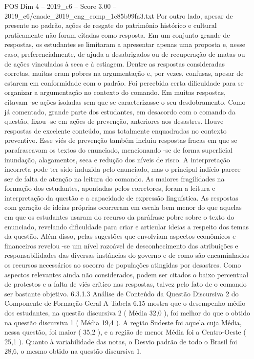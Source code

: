 \begin{textsample}{POS Dim 4 – 2019\_c6 – Score 3.00 – 2019\_c6/enade\_2019\_eng\_comp\_1c85b99fa3.txt}
Por outro lado, apesar de presente no padrão, ações de resgate do patrimônio histórico e cultural praticamente não foram citadas como resposta.
Em um conjunto grande de respostas, os estudantes se limitaram a apresentar apenas uma proposta e, nesse caso, preferencialmente, de ajuda a desabrigados ou de recuperação de matas ou de ações vinculadas à seca e à estiagem.
Dentre as respostas consideradas corretas, muitas eram pobres na argumentação e, por vezes, confusas, apesar de estarem em conformidade com o padrão.
Foi percebida certa dificuldade para se organizar a argumentação no contexto do comando.
Em muitas respostas, citavam -se ações isoladas sem que se caracterizasse o seu desdobramento.
Como já comentado, grande parte dos estudantes, em desacordo com o comando da questão, fixou -se em ações de prevenção, anteriores aos desastres.
Houve respostas de excelente conteúdo, mas totalmente enquadradas no contexto preventivo.
Esse viés de prevenção também incluiu respostas fracas em que se parafraseavam os textos do enunciado, mencionando -se de forma superficial inundação, alagamentos, seca e redução dos níveis de risco.
A interpretação incorreta pode ter sido induzida pelo enunciado, mas o principal indício parece ser de falta de atenção na leitura do comando.
As maiores fragilidades na formação dos estudantes, apontadas pelos corretores, foram a leitura e interpretação da questão e a capacidade de expressão linguística.
As respostas com geração de ideias próprias ocorreram em escala bem menor do que aquelas em que os estudantes usaram do recurso da paráfrase pobre sobre o texto do enunciado, revelando dificuldade para criar e articular ideias a respeito dos temas da questão.
Além disso, pelas sugestões que envolviam aspectos econômicos e financeiros revelou -se um nível razoável de desconhecimento das atribuições e responsabilidades das diversas instâncias do governo e de como são encaminhados os recursos necessários ao socorro de populações atingidas por desastres.
Como aspectos relevantes ainda não considerados, podem ser citados o baixo percentual de protestos e a falta de viés crítico nas respostas, talvez pelo fato de o comando ser bastante objetivo. 6.3.1.3 Análise de Conteúdo da Questão Discursiva 2 do Componente de Formação Geral A Tabela 6.15 mostra que o desempenho médio dos estudantes, na questão discursiva 2 ( Média 32,0 ), foi melhor do que o obtido na questão discursiva 1 ( Média 19,4 ).
A região Sudeste foi aquela cuja Média, nessa questão, foi maior ( 35,2 ), e a região de menor Média foi a Centro-Oeste ( 25,1 ).
Quanto à variabilidade das notas, o Desvio padrão de todo o Brasil foi 28,6, o mesmo obtido na questão discursiva 1.

\end{textsample}
